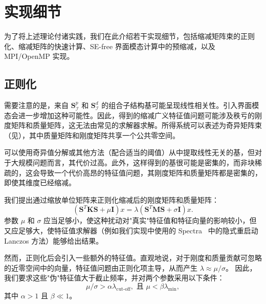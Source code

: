 \section{实现细节}\label{sec:implementation}

为了将上述理论付诸实践，我们在此介绍若干实现细节，包括缩减矩阵束的正则化、缩减矩阵的快速计算、SE-free 界面模态计算中的预缩减，以及 MPI/OpenMP 实现。

\subsection{正则化} \label{sec:regularization}

需要注意的是，来自 $\mathbf{S}^p_{\mathcal{I}}$ 和 $\mathbf{S}^d_{\mathcal{I}}$ 的组合子结构基可能呈现线性相关性。引入界面模态会进一步增加这种可能性。因此，得到的缩减广义特征值问题可能涉及秩亏的刚度矩阵和质量矩阵，这无法由常见的求解器求解。所得系统可以表述为奇异矩阵束（见），其中质量矩阵和刚度矩阵共享一个公共零空间。

可以使用奇异值分解或其他方法（配合适当的阈值）从中提取线性无关的基，但对于大规模问题而言，其代价过高。此外，这样得到的基很可能是密集的，而非块稀疏的，这会导致一个代价高昂的特征值问题，其刚度矩阵和质量矩阵都是密集的，即使其维度已经缩减。

我们提出通过缩放单位矩阵来正则化缩减后的刚度矩阵和质量矩阵：
\begin{equation}
  (\mathbf{S}^T \mathbf{K} \mathbf{S} + \mu \mathbf{I}) x = \lambda
  (\mathbf{S}^T \mathbf{M} \mathbf{S} + \sigma \mathbf{I})x.
  \label{eq:final-eig}
\end{equation}
参数 $\mu$ 和 $\sigma$ 应当足够小，使这种扰动对"真实"特征值和特征向量的影响较小，但又应足够大，使特征值求解器（例如我们实现中使用的 Spectra~\cite{Qiu2015Spectra} 中的隐式重启动 Lanczos 方法）能够给出结果。

然而，正则化后会引入一些额外的特征值。\textcolor{ExplainConclusion}{直观地说，对于刚度和质量贡献可忽略的近零空间中的向量，特征值问题由正则化项主导，从而产生 $\lambda \approx \mu / \sigma$。}
因此，我们要求这些"伪"特征值大于截止频率，并对两个参数采用以下条件：
\begin{equation}
  \mu / \sigma > \alpha \lambda_{\text{cut-off}}, \text{ 且 } \mu < \beta\lambda_{\min} ,
\end{equation}
其中 $\alpha > 1$ 且 $\beta \ll 1$。  

